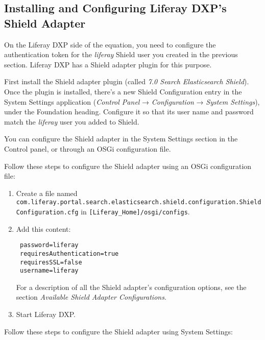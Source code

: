 \subsection{Installing and Configuring Liferay DXP's Shield
Adapter}\label{installing-and-configuring-liferay-dxps-shield-adapter}

On the Liferay DXP side of the equation, you need to configure the
authentication token for the \emph{liferay} Shield user you created in
the previous section. Liferay DXP has a Shield adapter plugin for this
purpose.

First install the Shield adapter plugin (called \emph{7.0 Search
Elasticsearch Shield}). Once the plugin is installed, there's a new
Shield Configuration entry in the System Settings application
(\emph{Control Panel} → \emph{Configuration} → \emph{System Settings}),
under the Foundation heading. Configure it so that its user name and
password match the \emph{liferay} user you added to Shield.

You can configure the Shield adapter in the System Settings section in
the Control panel, or through an OSGi configuration file.

Follow these steps to configure the Shield adapter using an OSGi
configuration file:

\begin{enumerate}
\def\labelenumi{\arabic{enumi}.}
\item
  Create a file named
  \texttt{com.liferay.portal.search.elasticsearch.shield.configuration.ShieldConfiguration.cfg}
  in \texttt{{[}Liferay\_Home{]}/osgi/configs}.
\item
  Add this content:

\begin{verbatim}
 password=liferay
 requiresAuthentication=true
 requiresSSL=false
 username=liferay
\end{verbatim}

  For a description of all the Shield adapter's configuration options,
  see the section \emph{Available Shield Adapter Configurations}.
\item
  Start Liferay DXP.
\end{enumerate}

Follow these steps to configure the Shield adapter using System
Settings:

